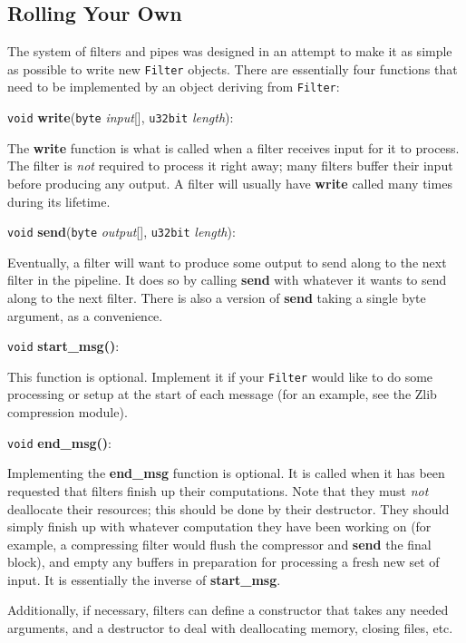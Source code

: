 \documentclass{article}
\newcommand{\function}[1]{\textbf{#1}}
\newcommand{\type}[1]{\texttt{#1}}
\renewcommand{\arg}[1]{\textsl{#1}}
\begin{document}
\subsection{Rolling Your Own}

The system of filters and pipes was designed in an attempt to make it
as simple as possible to write new \type{Filter} objects. There are
essentially four functions that need to be implemented by an object
deriving from \type{Filter}:

\noindent
\type{void} \function{write}(\type{byte} \arg{input}[], \type{u32bit}
\arg{length}):

The \function{write} function is what is called when a filter receives input
for it to process. The filter is \emph{not} required to process it right away;
many filters buffer their input before producing any output. A filter will
usually have \function{write} called many times during its lifetime.

\noindent
\type{void} \function{send}(\type{byte} \arg{output}[], \type{u32bit}
\arg{length}):

Eventually, a filter will want to produce some output to send along to the next
filter in the pipeline. It does so by calling \function{send} with whatever it
wants to send along to the next filter. There is also a version of
\function{send} taking a single byte argument, as a convenience.

\noindent
\type{void} \function{start\_msg()}:

This function is optional. Implement it if your \type{Filter} would like to do
some processing or setup at the start of each message (for an example, see the
Zlib compression module).

\noindent
\type{void} \function{end\_msg()}:

Implementing the \function{end\_msg} function is optional. It is called when it
has been requested that filters finish up their computations. Note that they
must \emph{not} deallocate their resources; this should be done by their
destructor. They should simply finish up with whatever computation they have
been working on (for example, a compressing filter would flush the compressor
and \function{send} the final block), and empty any buffers in preparation for
processing a fresh new set of input. It is essentially the inverse of
\function{start\_msg}.

Additionally, if necessary, filters can define a constructor that takes any
needed arguments, and a destructor to deal with deallocating memory, closing
files, etc.
\end{document}
